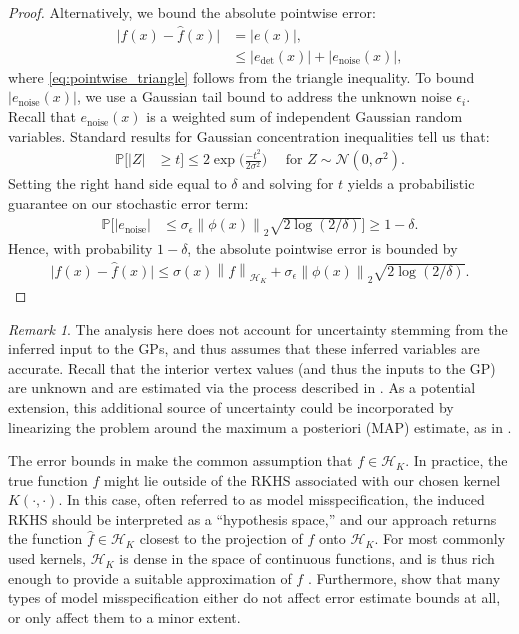 \documentclass{article}
\theoremstyle{definition}
\theoremstyle{remark}
\newtheorem*{remark}{Remark}
\newcommand{\norm}[1]{\left \lVert #1 \right \rVert}
\begin{document}
\begin{proof}
Alternatively, we bound the absolute pointwise error:
\begin{align}
    \lvert f(x)-\hat{f}(x)\rvert &= \lvert e(x)\rvert,\\
    &\leq \lvert e_\text{det}(x)\rvert + \lvert e_\text{noise}(x)\rvert,\label{eq:pointwise_triangle}
\end{align}
where \eqref{eq:pointwise_triangle} follows from the triangle inequality. To bound $\lvert e_\text{noise}(x)\rvert$, we use a Gaussian tail bound to address the unknown noise $\epsilon_i$. Recall that $e_\text{noise}(x)$ is a weighted sum of independent Gaussian random variables. Standard results for Gaussian concentration inequalities \cite{vershynin2018} tell us that:
\begin{align}
    \mathbb{P}\bigg[\lvert Z\rvert &\geq t\bigg]\leq 2\exp\Bigg(\frac{-t^2}{2\sigma^2}\Bigg)\quad\text{ for }Z\sim\mathcal{N}(0,\sigma^2).
\end{align}
Setting the right hand side equal to $\delta$ and solving for $t$ yields a probabilistic guarantee on our stochastic error term:
\begin{align}
\mathbb{P}\bigg[|e_\text{noise}|&\leq\sigma_{\epsilon}\norm{\phi(x)}_2\sqrt{2\log(2/\delta)}\bigg]\geq 1-\delta.
\end{align}
Hence, with probability $1-\delta$, the absolute pointwise error is bounded by
\begin{align}
    \lvert f(x)-\hat{f}(x)\rvert\leq \sigma(x)\norm{f}_{\mathcal{H}_K} +\sigma_{\epsilon}\norm{\phi(x)}_2\sqrt{2\log(2/\delta)}.
\end{align}

\end{proof}


\begin{remark}
The analysis here does not account for uncertainty stemming from the inferred input to the GPs, and thus assumes that these inferred variables are accurate. Recall that the interior vertex values (and thus the inputs to the GP) are unknown and are estimated via the process described in . As a potential extension, this additional source of uncertainty could be incorporated by linearizing the problem around the maximum a posteriori (MAP) estimate, as in \cite{chen_gaussian_2024}.
\end{remark}

The error bounds in  make the common assumption that $f\in\mathcal{H}_K$. 
In practice, the true function $f$ might lie outside of the RKHS associated with our chosen kernel $K(\cdot,\cdot)$. In this case, often referred to as model misspecification, the induced RKHS should be interpreted as a ``hypothesis space,'' and our approach returns the function $\hat{f}\in\mathcal{H}_K$ closest to the projection of $f$ onto $\mathcal{H}_K$. For most commonly used kernels, $\mathcal{H}_K$ is dense in the space of continuous functions, and is thus rich enough to provide a suitable approximation of $f$ \cite{steinwart}. Furthermore, \cite{fiedler_practical_2023} show that many types of model misspecification either do not affect error estimate bounds at all, or only affect them to a minor extent.
\end{document}
